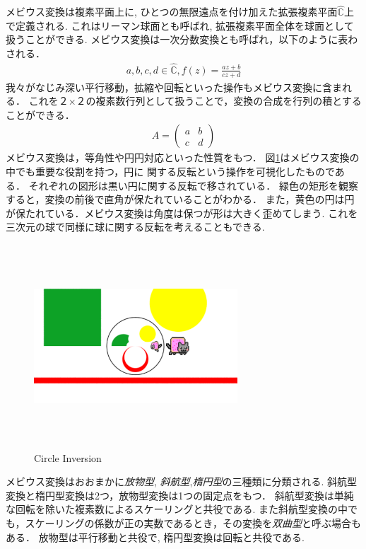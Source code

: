 メビウス変換は複素平面上に, ひとつの無限遠点を付け加えた拡張複素平面$\hat{\mathbb{C}}$上で定義される.
これはリーマン球面とも呼ばれ, 拡張複素平面全体を球面として扱うことができる.
メビウス変換は一次分数変換とも呼ばれ，以下のように表わされる．
\begin{eqnarray*}
 a, b, c, d\in \hat{\mathbb{C}}, f(z) = \frac{az + b}{cz + d}
\end{eqnarray*}
我々がなじみ深い平行移動，拡縮や回転といった操作もメビウス変換に含まれる．
これを２×２の複素数行列として扱うことで，変換の合成を行列の積とすることができる．
\begin{eqnarray*}
  A = \left(
    \begin{array}{ccc}
      a & b \\
      c & d
    \end{array}
  \right)
\end{eqnarray*}
メビウス変換は，等角性や円円対応といった性質をもつ．
図\ref{fig:circleInversion}はメビウス変換の中でも重要な役割を持つ，円に
関する反転という操作を可視化したものである．
それぞれの図形は黒い円に関する反転で移されている．
緑色の矩形を観察すると，変換の前後で直角が保たれていることがわかる．
また，黄色の円は円が保たれている．メビウス変換は角度は保つが形は大きく歪めてしまう.
これを三次元の球で同様に球に関する反転を考えることもできる.
\begin{figure}[htbp]
 \begin{center}
      \includegraphics[width=3in, height=3in, keepaspectratio]{../img/klein/circleInversion.pdf}
    \caption{Circle Inversion}
    \label{fig:circleInversion}
 \end{center}
\end{figure}

メビウス変換はおおまかに\emph{放物型}, \emph{斜航型},\emph{楕円型}の三種類に分類される.
斜航型変換と楕円型変換は2つ，放物型変換は1つの固定点をもつ．
斜航型変換は単純な回転を除いた複素数によるスケーリングと共役である.
また斜航型変換の中でも，スケーリングの係数が正の実数であるとき，その変換を\emph{双曲型}と呼ぶ場合もある．
放物型は平行移動と共役で, 楕円型変換は回転と共役である.

